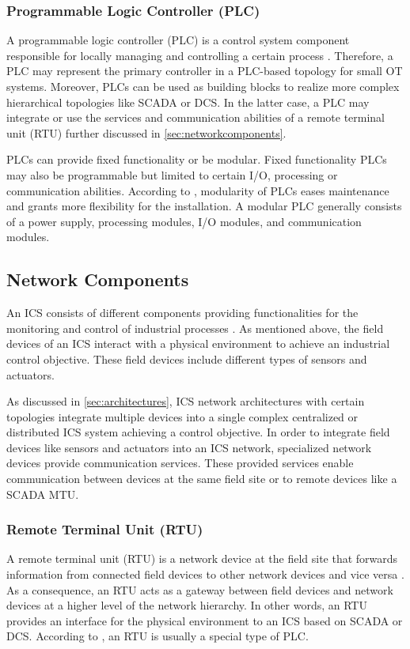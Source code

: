 \subsubsection{Programmable Logic Controller (PLC)}
A programmable logic controller (PLC) is a control system component responsible for locally managing and controlling a certain process \cite{Stouffer2023}.
Therefore, a PLC may represent the primary controller in a PLC-based topology for small OT systems.
Moreover, PLCs can be used as building blocks to realize more complex hierarchical topologies like SCADA or DCS.
In the latter case, a PLC may integrate or use the services and communication abilities of a remote terminal unit (RTU) further discussed in \autoref{sec:networkcomponents}.

PLCs can provide fixed functionality or be modular.
Fixed functionality PLCs may also be programmable but limited to certain I/O, processing or communication abilities.
According to \citeauthor{Galloway2013} \cite{Galloway2013}, modularity of PLCs eases maintenance and grants more flexibility for the installation.
A modular PLC generally consists of a power supply, processing modules, I/O modules, and communication modules.

\subsection{Network Components}
\label{sec:networkcomponents}
An ICS consists of different components providing functionalities for the monitoring and control of industrial processes \cite{Stouffer2023}.
As mentioned above, the field devices of an ICS interact with a physical environment to achieve an industrial control objective.
These field devices include different types of sensors and actuators.

As discussed in \autoref{sec:architectures}, ICS network architectures with certain topologies integrate multiple devices into a single complex centralized or distributed ICS system achieving a control objective.
In order to integrate field devices like sensors and actuators into an ICS network, specialized network devices provide communication services.
These provided services enable communication between devices at the same field site or to remote devices like a SCADA MTU. 

\subsubsection{Remote Terminal Unit (RTU)}
A remote terminal unit (RTU) is a network device at the field site that forwards information from connected field devices to other network devices and vice versa \cite{Stouffer2023}.
As a consequence, an RTU acts as a gateway between field devices and network devices at a higher level of the network hierarchy.
In other words, an RTU provides an interface for the physical environment to an ICS based on SCADA or DCS.
According to \citeauthor{Galloway2013} \cite{Galloway2013}, an RTU is usually a special type of PLC. 

